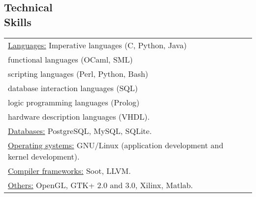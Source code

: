 \documentclass[margin]{res}
\begin{document}
\begin{resume}
\section{Technical \\ Skills}
   \begin{tabular}{l p{3in}}
    \underline{Languages:} Imperative languages (C, Python, Java) \\
    functional languages (OCaml, SML) \\ scripting languages (Perl,
    Python, Bash) \\ database interaction languages (SQL) \\ logic
    programming languages (Prolog) \\ hardware description languages
    (VHDL). \\

    \underline{Databases:} PostgreSQL, MySQL, SQLite. \\

    \underline{Operating systems:} GNU/Linux (application development
    and kernel development). \\

    \underline{Compiler frameworks:} Soot, LLVM. \\

    \underline{Others:} OpenGL, GTK+ 2.0 and 3.0, Xilinx, Matlab. \\
 \end{tabular}

\end{resume} 
\end{document}
